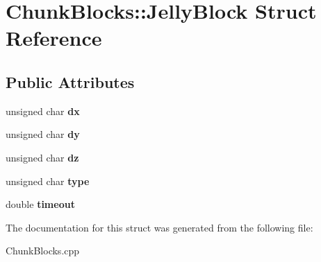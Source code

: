 \hypertarget{structChunkBlocks_1_1JellyBlock}{\section{\-Chunk\-Blocks\-:\-:\-Jelly\-Block \-Struct \-Reference}
\label{structChunkBlocks_1_1JellyBlock}
}
\subsection*{\-Public \-Attributes}
\begin{DoxyCompactItemize}
\item 
\hypertarget{structChunkBlocks_1_1JellyBlock_a6c6aa7fbebea834a36b53af522bfc558}{unsigned char {\bfseries dx}}\label{structChunkBlocks_1_1JellyBlock_a6c6aa7fbebea834a36b53af522bfc558}

\item 
\hypertarget{structChunkBlocks_1_1JellyBlock_a427e1077d73da4eb413a3e5f7c4c01ce}{unsigned char {\bfseries dy}}\label{structChunkBlocks_1_1JellyBlock_a427e1077d73da4eb413a3e5f7c4c01ce}

\item 
\hypertarget{structChunkBlocks_1_1JellyBlock_a69f2f9efb551b8cf10083ef47ab18890}{unsigned char {\bfseries dz}}\label{structChunkBlocks_1_1JellyBlock_a69f2f9efb551b8cf10083ef47ab18890}

\item 
\hypertarget{structChunkBlocks_1_1JellyBlock_a6c3fffcce76cb6c2d6dab5cc4d26d64c}{unsigned char {\bfseries type}}\label{structChunkBlocks_1_1JellyBlock_a6c3fffcce76cb6c2d6dab5cc4d26d64c}

\item 
\hypertarget{structChunkBlocks_1_1JellyBlock_a6b622919d735a7da6d63b33c8373e2fb}{double {\bfseries timeout}}\label{structChunkBlocks_1_1JellyBlock_a6b622919d735a7da6d63b33c8373e2fb}

\end{DoxyCompactItemize}


\-The documentation for this struct was generated from the following file\-:\begin{DoxyCompactItemize}
\item 
\-Chunk\-Blocks.\-cpp\end{DoxyCompactItemize}
